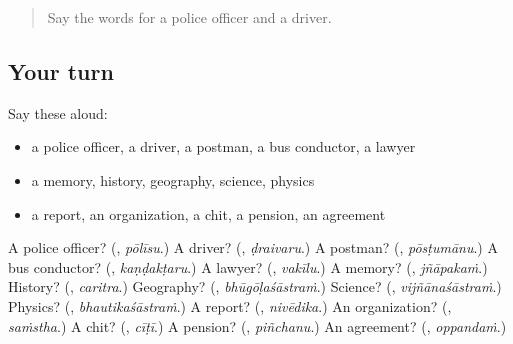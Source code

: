 \begin{quote}
Say the words for a police officer and a driver.
\end{quote}

\subsection*{Your turn}
Say these aloud:

\begin{itemize}
\raggedright
  \item a police officer, a driver, a postman, a bus conductor, a lawyer
  \item a memory, history, geography, science, physics
  \item a report, an organization, a chit, a pension, an agreement
\end{itemize}

\begin{tcolorbox}[breakable,colback=teal!4,colframe=teal!35!black,title={Before you move on}]
A police officer? (\textbf{}, \emph{pōlīsu}.) A driver? (\textbf{}, \emph{ḍraivaru}.) A postman? (\textbf{}, \emph{pōsṭumānu}.) A bus conductor? (\textbf{}, \emph{kaṇḍakṭaru}.) A lawyer? (\textbf{}, \emph{vakīlu}.) A memory? (\textbf{}, \emph{jñāpakaṁ}.) History? (\textbf{}, \emph{caritra}.) Geography? (\textbf{}, \emph{bhūgōḷaśāstraṁ}.) Science? (\textbf{}, \emph{vijñānaśāstraṁ}.) Physics? (\textbf{}, \emph{bhautikaśāstraṁ}.) A report? (\textbf{}, \emph{nivēdika}.) An organization? (\textbf{}, \emph{saṁstha}.) A chit? (\textbf{}, \emph{cīṭī}.) A pension? (\textbf{}, \emph{piñchanu}.) An agreement? (\textbf{}, \emph{oppandaṁ}.)
\end{tcolorbox}
